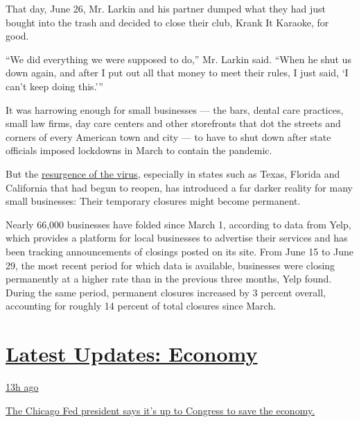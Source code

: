 That day, June 26, Mr. Larkin and his partner dumped what they had just
bought into the trash and decided to close their club, Krank It Karaoke,
for good.

``We did everything we were supposed to do,'' Mr. Larkin said. ``When he
shut us down again, and after I put out all that money to meet their
rules, I just said, `I can't keep doing this.'''

It was harrowing enough for small businesses --- the bars, dental care
practices, small law firms, day care centers and other storefronts that
dot the streets and corners of every American town and city --- to have
to shut down after state officials imposed lockdowns in March to contain
the pandemic.

But the
\href{https://www.nytimes3xbfgragh.onion/2020/06/26/us/coronavirus-florida-texas-bars-closing.html}{resurgence
of the virus}, especially in states such as Texas, Florida and
California that had begun to reopen, has introduced a far darker reality
for many small businesses: Their temporary closures might become
permanent.

Nearly 66,000 businesses have folded since March 1, according to data
from Yelp, which provides a platform for local businesses to advertise
their services and has been tracking announcements of closings posted on
its site. From June 15 to June 29, the most recent period for which data
is available, businesses were closing permanently at a higher rate than
in the previous three months, Yelp found. During the same period,
permanent closures increased by 3 percent overall, accounting for
roughly 14 percent of total closures since March.

\hypertarget{latest-updates-economy}{%
\section{\texorpdfstring{\href{https://www.nytimes3xbfgragh.onion/live/2020/08/03/business/stock-market-today-coronavirus?action=click\&pgtype=Article\&state=default\&region=MAIN_CONTENT_1\&context=storylines_live_updates}{Latest
Updates:
Economy}}{Latest Updates: Economy}}\label{latest-updates-economy}}

\href{https://www.nytimes3xbfgragh.onion/live/2020/08/03/business/stock-market-today-coronavirus?action=click\&pgtype=Article\&state=default\&region=MAIN_CONTENT_1\&context=storylines_live_updates\#the-chicago-fed-president-says-its-up-to-congress-to-save-the-economy}{13h
ago}

\href{https://www.nytimes3xbfgragh.onion/live/2020/08/03/business/stock-market-today-coronavirus?action=click\&pgtype=Article\&state=default\&region=MAIN_CONTENT_1\&context=storylines_live_updates\#the-chicago-fed-president-says-its-up-to-congress-to-save-the-economy}{The
Chicago Fed president says it's up to Congress to save the economy.}

